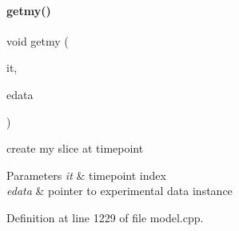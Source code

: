 \paragraph{\texorpdfstring{getmy()}{getmy()}}
{\footnotesize\ttfamily void getmy (\begin{DoxyParamCaption}\item[{const int}]{it,  }\item[{const \mbox{\hyperlink{classamici_1_1_exp_data}{Exp\+Data}} $\ast$}]{edata }\end{DoxyParamCaption})\hspace{0.3cm}{\ttfamily [protected]}}

create my slice at timepoint 
\begin{DoxyParams}{Parameters}
{\em it} & timepoint index \\
\hline
{\em edata} & pointer to experimental data instance \\
\hline
\end{DoxyParams}


Definition at line 1229 of file model.\+cpp.

